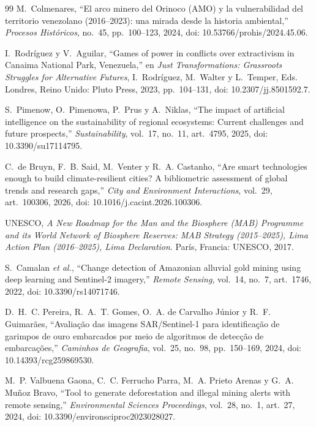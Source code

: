 \documentclass[conference]{IEEEtran}
\begin{document}
\begin{thebibliography}{99}
M.~Colmenares, ``El arco minero del Orinoco (AMO) y la vulnerabilidad del territorio venezolano (2016--2023): una mirada desde la historia ambiental,'' \emph{Procesos Históricos}, no.~45, pp.~100--123, 2024, doi: 10.53766/prohis/2024.45.06.

I.~Rodríguez y V.~Aguilar, ``Games of power in conflicts over extractivism in Canaima National Park, Venezuela,'' en \emph{Just Transformations: Grassroots Struggles for Alternative Futures}, I.~Rodríguez, M.~Walter y L.~Temper, Eds. Londres, Reino Unido: Pluto Press, 2023, pp.~104--131, doi: 10.2307/jj.8501592.7.

S.~Pimenow, O.~Pimenowa, P.~Prus y A.~Niklas, ``The impact of artificial intelligence on the sustainability of regional ecosystems: Current challenges and future prospects,'' \emph{Sustainability}, vol.~17, no.~11, art.~4795, 2025, doi: 10.3390/su17114795.

C.~de Bruyn, F.~B. Said, M.~Venter y R.~A. Castanho, ``Are smart technologies enough to build climate-resilient cities? A bibliometric assessment of global trends and research gaps,'' \emph{City and Environment Interactions}, vol.~29, art.~100306, 2026, doi: 10.1016/j.cacint.2026.100306.

UNESCO, \emph{A New Roadmap for the Man and the Biosphere (MAB) Programme and its World Network of Biosphere Reserves: MAB Strategy (2015--2025), Lima Action Plan (2016--2025), Lima Declaration}. París, Francia: UNESCO, 2017.

S.~Camalan \emph{et al.}, ``Change detection of Amazonian alluvial gold mining using deep learning and Sentinel-2 imagery,'' \emph{Remote Sensing}, vol.~14, no.~7, art.~1746, 2022, doi: 10.3390/rs14071746.

D.~H.~C. Pereira, R.~A.~T. Gomes, O.~A. de Carvalho Júnior y R.~F. Guimarães, ``Avaliação das imagens SAR/Sentinel-1 para identificação de garimpos de ouro embarcados por meio de algoritmos de detecção de embarcações,'' \emph{Caminhos de Geografia}, vol.~25, no.~98, pp.~150--169, 2024, doi: 10.14393/rcg259869530.

M.~P. Valbuena Gaona, C.~C. Ferrucho Parra, M.~A. Prieto Arenas y G.~A. Muñoz Bravo, ``Tool to generate deforestation and illegal mining alerts with remote sensing,'' \emph{Environmental Sciences Proceedings}, vol.~28, no.~1, art.~27, 2024, doi: 10.3390/environsciproc2023028027.


\end{thebibliography}
\end{document}
